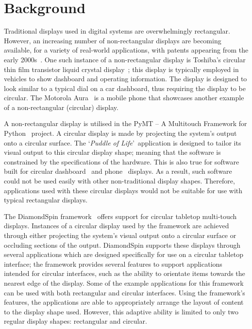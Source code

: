 \documentclass[twocolumn,compsoc]{cvm}
\begin{document}
\section{Background}
\label{sec:related}

Traditional displays used in digital systems are overwhelmingly rectangular.
However, an increasing number of non-rectangular displays are becoming available, for a variety of real-world applications, with patents appearing from the early 2000s~\cite{Battersby2002}.
One such instance of a non-rectangular display is Toshiba's circular
thin film transistor liquid crystal display~\cite{Boyd2007}; this display is typically employed in vehicles to show dashboard and operating information.
The display is designed to look similar to a typical dial on a car dashboard, thus requiring the display to be circular.
The Motorola Aura~\cite{Finney2009} is a mobile phone that showcases another example of a non-rectangular (circular) display.

A non-rectangular display is utilised in the PyMT -- A Multitouch Framework for Python~\cite{Hansen2009} project.
A circular display is made by projecting the system's output onto a circular surface.
The \lq {\emph{Puddle of Life}}\rq\ application is designed to tailor its visual output to this circular display shape; meaning that the software is constrained by the specifications of the hardware.
This is also true for software built for circular dashboard~\cite{Boyd2007} and phone~\cite{Finney2009} displays.
As a result, such software could not be used easily with other non-traditional display shapes.
Therefore, applications used with these circular displays would not be suitable for use with typical rectangular displays.

The DiamondSpin framework~\cite{Shen2004} offers support for circular tabletop multi-touch displays.
Instances of a circular display used by the framework are achieved through either projecting the system's visual output onto a circular surface or occluding sections of the output.
DiamondSpin supports these displays through several applications which are designed specifically for use on a circular tabletop interface; the framework provides several features to support applications intended for circular interfaces, such as the ability to orientate items towards the nearest edge of the display.
Some of the example applications for this framework can be used with both rectangular and circular interfaces.
Using the framework's features, the applications are able to appropriately arrange the layout of content to the display shape used.
However, this adaptive ability is limited to only two regular display shapes: rectangular and circular.
\end{document}
